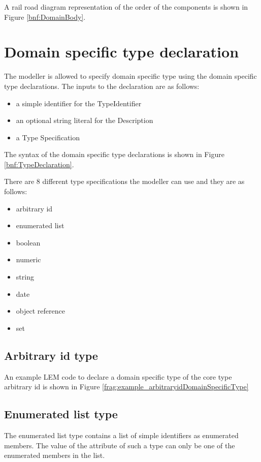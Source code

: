 A rail road diagram representation of the order of the components is shown in Figure \ref{bnf:DomainBody}.


\section{Domain specific type declaration}\label{sec:domainSpecificType}
The modeller is allowed to specify domain specific type using the domain specific type declarations. The inputs to the declaration are as follows:

\begin{itemize}
\item a simple identifier for the TypeIdentifier
\item an optional string literal for the Description
\item a Type Specification
\end{itemize}

The syntax of the domain specific type declarations is shown in Figure \ref{bnf:TypeDeclaration}.

There are 8 different type specifications the modeller can use and they are as follows:
\begin{itemize}
\item arbitrary id
\item enumerated list
\item boolean
\item numeric
\item string
\item date
\item object reference
\item set
\end{itemize}

\subsection{Arbitrary id type}
An example LEM code to declare a domain specific type of the core type arbitrary id is shown in Figure \ref{frag:example_arbitraryidDomainSpecificType}


\subsection{Enumerated list type}
The enumerated list type contains a list of simple identifiers as enumerated members. The value of the attribute of such a type can only be one of the enumerated members in the list.

